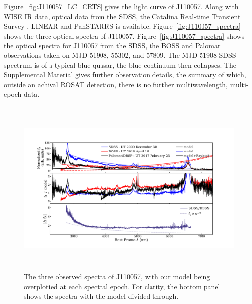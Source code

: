 \documentclass{nature}
\begin{document}
Figure~\ref{fig:J110057_LC_CRTS} gives the light curve of J110057.
Along with WISE IR data, optical data from the SDSS, the Catalina
Real-time Transient Survey \citep[CRTS;][]{Drake2009, Mahabal2011},
LINEAR \citep{Sesar2011} and PanSTARRS \citep{Kaiser2010, Stubbs2010,
Tonry2012, Magnier2013} is available.
Figure~\ref{fig:J110057_spectra} shows the three optical spectra of
J110057. Figure~\ref{fig:J110057_spectra} shows the optical spectra
for J110057 from the SDSS, the BOSS and Palomar observations taken on
MJD 51908, 55302, and 57809. The MJD 51908 SDSS spectrum is of a
typical blue quasar, the blue continuum then collapses.  The
Supplemental Material gives further observation details, the summary
of which, outside an achival ROSAT detection, there is no further
multiwavelength, multi-epoch data.



\begin{figure}
  \includegraphics[width=15.4cm, height=8.75cm, trim=0.0cm 0.0cm 0.0cm 0.0cm, clip]
  {../plots/models/mcd_gap_v3_20171017v1.pdf}
  \centering
  \caption[]{The three observed spectra of J110057, with our model
    being overplotted at each spectral epoch. For clarity, the bottom
    panel shows the spectra with the model divided through. }
  \label{fig:J110057_diskmodel}
\end{figure}
\end{document}
